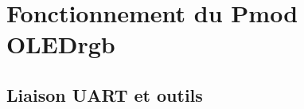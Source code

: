 \documentclass[11pt]{article}
\begin{document}

\clearpage

\section{Fonctionnement du Pmod OLEDrgb}

\subsection{Liaison UART et outils}
\end{document}
